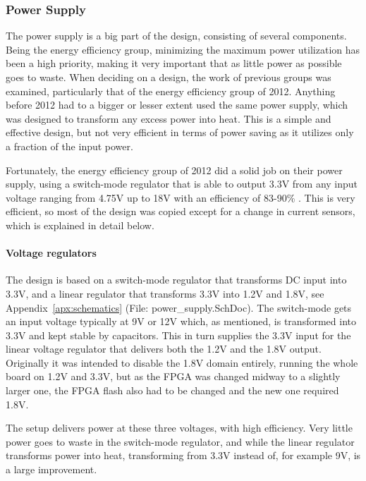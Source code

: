 
\subsubsection{Power Supply}

The power supply is a big part of the design, consisting of several components. Being the energy efficiency
group, minimizing the maximum power utilization has been a high priority, making
it very important that as little power as possible goes to waste. When deciding
on a design, the work of previous groups was examined, particularly that of the
energy efficiency group of 2012. Anything before 2012 had to a bigger or lesser
extent used the same power supply, which was designed to transform any excess
power into heat. This is a simple and effective design, but not very efficient
in terms of power saving as it utilizes only a fraction of the input power.

Fortunately, the energy efficiency group of 2012 did a solid job on their power
supply, using a switch-mode regulator that is able to output 3.3V from any input
voltage ranging from 4.75V up to 18V with an efficiency of 83-90\% . This is very efficient, so most of the design
was copied except for a change in current sensors, which is explained in detail
below.

\paragraph{Voltage regulators}

The design is based on a switch-mode regulator that transforms DC input into
3.3V, and a linear regulator
that transforms 3.3V into 1.2V and 1.8V, see Appendix~\ref{apx:schematics}
(File: power\_supply.SchDoc). The
switch-mode gets an input voltage typically at 9V or 12V which, as mentioned, is
transformed into 3.3V and kept stable by capacitors. This in turn supplies the
3.3V input for the linear voltage regulator that delivers both the 1.2V and the
1.8V output. Originally it was intended to disable the 1.8V domain entirely,
running the whole board on 1.2V and 3.3V, but as the FPGA was changed midway to
a slightly larger one, the FPGA flash also had to be changed and the new one
required 1.8V.

The setup delivers power at these three voltages, with high efficiency. Very
little power goes to waste in the switch-mode regulator, and while the linear
regulator transforms power into heat, transforming from 3.3V instead of, for
example 9V, is a large improvement.


